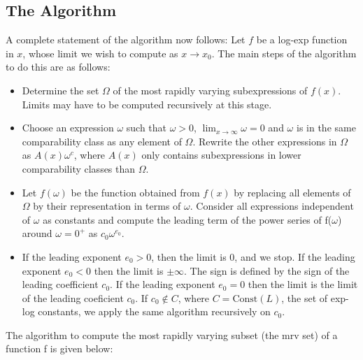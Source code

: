 \subsection{The Algorithm}
A complete statement of the algorithm now follows:
Let $f$ be a log-exp function in $x$, whose limit we wish to compute
as $x\rightarrow x_0.$ The main steps of the algorithm to do this are
as follows:
\begin{itemize}
\item Determine the set $\Omega$ of the most rapidly varying
  subexpressions of $f(x)$. Limits may have to be computed recursively
  at this stage.
\item Choose an expression $\omega$ such that $\omega>0$,
  $\lim_{x \rightarrow \infty} \omega=0 $ and $\omega$ is in the same
  comparability class as any element of $\Omega$. Rewrite the other
  expressions in $\Omega$ as $A(x)\omega^{c}$, where $A(x)$ only
  contains subexpressions in lower comparability classes than
  $\Omega$.
\item Let $f(\omega)$ be the function obtained from $f(x)$ by
  replacing all elements of $\Omega $ by their representation in terms
  of $\omega$. Consider all expressions independent of $\omega$ as
  constants and compute the leading term of the power series of
  f($\omega$) around $\omega=0^{+}$ as $c_{0}\omega^{e_{0}}$.
\item If the leading exponent $e_0>0$, then the limit is 0, and we
  stop. If the leading exponent $e_0<0$ then the limit is
  $\pm \infty$. The sign is defined by the sign of the leading
  coefficient $c_0$. If the leading exponent $e_0=0$ then the limit is
  the limit of the leading coeficient $c_0$. If $c_0\not \in C$, where
  $C=\text{Const}(L)$, the set of exp-log constants, we apply the same
  algorithm recursively on $c_0$.
\end{itemize}

The algorithm to compute the most rapidly varying subset (the mrv set) of a function f is given below:

